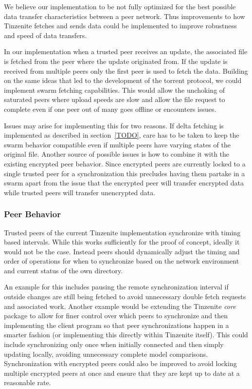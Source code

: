 We believe our implementation to be not fully optimized for the best possible data transfer characteristics between a peer network.
Thus improvements to how Tinzenite fetches and sends data could be implemented to improve robustness and speed of data transfers.

In our implementation when a trusted peer receives an update, the associated file is fetched from the peer where the update originated from.
If the update is received from multiple peers only the first peer is used to fetch the data.
Building on the same ideas that led to the development of the torrent protocol, we could implement swarm fetching capabilities.
This would allow the unchoking of saturated peers where upload speeds are slow and allow the file request to complete even if one peer out of many goes offline or encounters issues.

Issues may arise for implementing this for two reasons.
If delta fetching is implemented as described in section~\ref{TODO}, care has to be taken to keep the swarm behavior compatible even if multiple peers have varying states of the original file.
Another source of possible issues is how to combine it with the existing encrypted peer behavior.
Since encrypted peers are currently locked to a single trusted peer for a synchronization this precludes having them partake in a swarm apart from the issue that the encrypted peer will transfer encrypted data while trusted peers will transfer unencrypted data.

\subsubsection{Peer Behavior}
\label{subs:Peer Behavior}

Trusted peers of the current Tinzenite implementation synchronize with timing based intervals.
While this works sufficiently for the proof of concept, ideally it would not be the case.
Instead peers should dynamically adjust the timing and order of operations for when to synchronize based on the network environment and current status of the own directory.

An example for this includes pausing the remote synchronization interval if outside changes are still being fetched to avoid unnecessary double fetch requests and associated work.
Another example would be extending the Tinzenite \emph{core} package to allow for finer control over which peers to synchronize and then implementing the client program so that peer synchronizations happen in a smarter fashion (or implementing this directly within Tinzenite itself).
This could include synchronizing only once when initially connected and then simply updating locally, avoiding unnecessary complete model comparisons.
Synchronization with encrypted peers could also be improved to avoid locking multiple encrypted peers at once and ensure that they are kept up to date at a reasonable rate.

